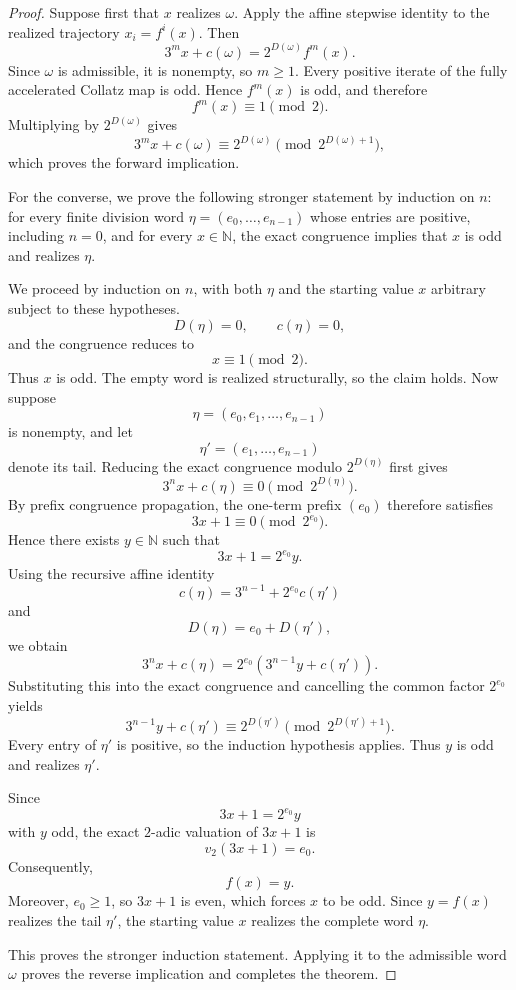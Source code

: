 \documentclass[12pt, oneside]{article}
\numberwithin{equation}{section}
\theoremstyle{definition}
\theoremstyle{plain}
\theoremstyle{remark}
\begin{document}
\begin{proof}
Suppose first that \(x\) realizes \(\omega\). Apply the affine stepwise
identity to the realized trajectory \(x_i=f^i(x)\). Then
\[
3^m x+c(\omega) = 2^{D(\omega)}f^m(x).
\]
Since \(\omega\) is admissible, it is nonempty, so \(m\ge1\). Every
positive iterate of the fully accelerated Collatz map is odd. Hence
\(f^m(x)\) is odd, and therefore
\[
f^m(x)\equiv1\pmod2.
\]
Multiplying by \(2^{D(\omega)}\) gives
\[
3^m x+c(\omega) \equiv 2^{D(\omega)} \pmod{2^{D(\omega)+1}},
\]
which proves the forward implication.

For the converse, we prove the following stronger statement by induction
on \(n\): for every finite division word \(\eta=(e_0,\dots,e_{n-1})\) whose
entries are positive, including \(n=0\), and for every \(x\in\mathbb N\),
the exact congruence implies that \(x\) is odd and realizes \(\eta\).

We proceed by induction on \(n\), with both \(\eta\) and the starting value
\(x\) arbitrary subject to these hypotheses.
\[
D(\eta)=0,
\qquad
c(\eta)=0,
\]
and the congruence reduces to
\[
x\equiv1\pmod2.
\]
Thus \(x\) is odd. The empty word is realized structurally, so the claim
holds.  Now suppose
\[
\eta=(e_0,e_1,\dots,e_{n-1})
\]
is nonempty, and let
\[
\eta'=(e_1,\dots,e_{n-1})
\]
denote its tail. Reducing the exact congruence modulo
\(2^{D(\eta)}\) first gives
\[
3^n x+c(\eta) \equiv0\pmod{2^{D(\eta)}}.
\]
By prefix congruence propagation, the one-term prefix \((e_0)\) therefore
satisfies
\[
3x+1\equiv0\pmod{2^{e_0}}.
\]
Hence there exists \(y\in\mathbb N\) such that
\[
3x+1=2^{e_0}y.
\]
Using the recursive affine identity
\[
c(\eta) = 3^{n-1} + 2^{e_0}c(\eta')
\]
and
\[
D(\eta)=e_0+D(\eta'),
\]
we obtain
\[
3^n x+c(\eta) = 2^{e_0} \left(  3^{n-1}y+c(\eta')  \right).
\]
Substituting this into the exact congruence and cancelling the common
factor \(2^{e_0}\) yields
\[
3^{n-1}y+c(\eta') \equiv 2^{D(\eta')} \pmod{2^{D(\eta')+1}}.
\]
Every entry of \(\eta'\) is positive, so the induction hypothesis applies.
Thus \(y\) is odd and realizes \(\eta'\).

Since
\[
3x+1=2^{e_0}y
\]
with \(y\) odd, the exact \(2\)-adic valuation of \(3x+1\) is
\[
v_2(3x+1)=e_0.
\]
Consequently,
\[
f(x)=y.
\]
Moreover, \(e_0\ge1\), so \(3x+1\) is even, which forces \(x\) to be odd.
Since \(y=f(x)\) realizes the tail \(\eta'\), the starting value \(x\)
realizes the complete word \(\eta\).

This proves the stronger induction statement. Applying it to the
admissible word \(\omega\) proves the reverse implication and completes
the theorem.
\end{proof}
\end{document}
